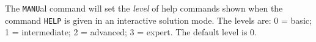 \headb

The {\tt MANU}al command will set the {\it level} of help commands
shown when the command {\tt HELP} is given in an interactive solution mode.
The levels are: 0 = basic; 1 = intermediate; 2 = advanced; 3 = expert.
The default level is 0.
\vfil\eject
